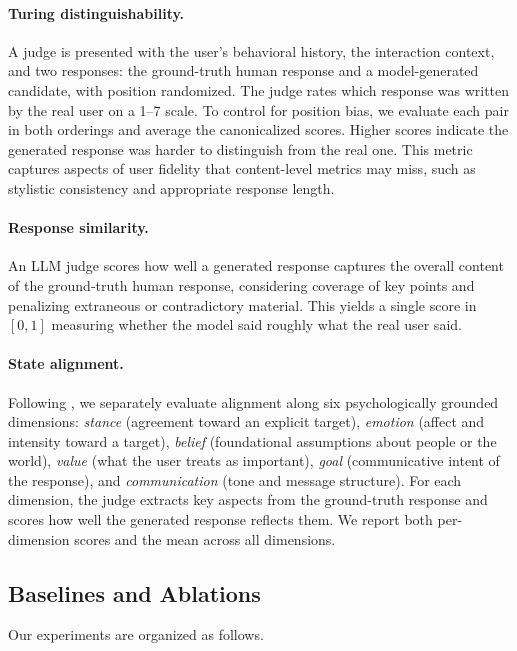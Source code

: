 \documentclass{article}
\begin{document}
\paragraph{Turing distinguishability.}
A judge is presented with the user's behavioral history, the interaction context, and two responses: the ground-truth human response and a model-generated candidate, with position randomized. The judge rates which response was written by the real user on a 1--7 scale. To control for position bias, we evaluate each pair in both orderings and average the canonicalized scores. Higher scores indicate the generated response was harder to distinguish from the real one. This metric captures aspects of user fidelity that content-level metrics may miss, such as stylistic consistency and appropriate response length.
 
\paragraph{Response similarity.}
An LLM judge scores how well a generated response captures the overall content of the ground-truth human response, considering coverage of key points and penalizing extraneous or contradictory material. This yields a single score in $[0, 1]$ measuring whether the model said roughly what the real user said.
 
\paragraph{State alignment.}
Following \citet{wu2026humanlm}, we separately evaluate alignment along six psychologically grounded dimensions: \emph{stance} (agreement toward an explicit target), \emph{emotion} (affect and intensity toward a target), \emph{belief} (foundational assumptions about people or the world), \emph{value} (what the user treats as important), \emph{goal} (communicative intent of the response), and \emph{communication} (tone and message structure). For each dimension, the judge extracts key aspects from the ground-truth response and scores how well the generated response reflects them. We report both per-dimension scores and the mean across all dimensions.
 
\subsection{Baselines and Ablations}
 
Our experiments are organized as follows.
 
\end{document}
